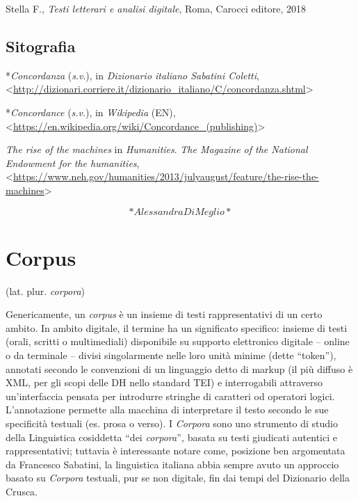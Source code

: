 \documentclass[
  b5paper,
  twoside,
  11pt,
  chapterprefix=false,
  bibliography=totocnumbered,
  parskip=0]{scrbook}
\begin{document}
Stella F., \emph{Testi letterari e analisi digitale}, Roma, Carocci editore,
2018

\hypertarget{sitografia-4}{%
\section*{Sitografia}\label{sitografia-4}}

*\emph{Concordanza} (\emph{s}.\emph{v}.), in \emph{Dizionario italiano Sabatini Coletti},
\textless{}{\url{http://dizionari.corriere.it/dizionario_italiano/C/concordanza.shtml}\textgreater{}}

*\emph{Concordance} (\emph{s.v}.), in \emph{Wikipedia} (EN),
\textless{}{\url{https://en.wikipedia.org/wiki/Concordance_(publishing)}\textgreater{}}

\emph{The rise of the} \emph{machines} in \emph{Humanities}. \emph{The Magazine of the
National Endowment for the humanities},
\textless{}{\url{https://www.neh.gov/humanities/2013/julyaugust/feature/the-rise-the-machines}\textgreater{}}

\[*Alessandra Di Meglio*\]

\hypertarget{corpus}{%
\chapter{Corpus}\label{corpus}}

(lat. plur. \emph{corpora})

Genericamente, un \emph{corpus} è un insieme di testi rappresentativi di un
certo ambito. In ambito digitale, il termine ha un significato
specifico: insieme di testi (orali, scritti o multimediali) disponibile
su supporto elettronico digitale -- online o da terminale -- divisi
singolarmente nelle loro unità minime (dette \enquote{token}), annotati secondo
le convenzioni di un linguaggio detto di markup (il più diffuso è XML,
per gli scopi delle DH nello standard TEI) e interrogabili attraverso
un'interfaccia pensata per introdurre stringhe di caratteri od operatori
logici. L'annotazione permette alla macchina di interpretare il testo
secondo le sue specificità testuali (es. prosa o verso). I \emph{Corpora}
sono uno strumento di studio della Linguistica cosiddetta \enquote{dei
\emph{corpora}}\emph{,} basata su testi giudicati autentici e rappresentativi;
tuttavia è interessante notare come, posizione ben argomentata da
Francesco Sabatini, la linguistica italiana abbia sempre avuto un
approccio basato su \emph{Corpora} testuali, pur se non digitale, fin dai
tempi del Dizionario della Crusca.
\end{document}
